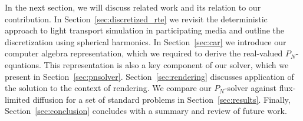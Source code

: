 In the next section, we will discuss related work and its relation to our contribution. In Section~\ref{sec:discretized_rte} we revisit the deterministic approach to light transport simulation in participating media and outline the discretization using spherical harmonics. In Section~\ref{sec:car} we introduce our computer algebra representation, which we required to derive the real-valued $P_N$-equations. This representation is also a key component of our solver, which we present in Section~\ref{sec:pnsolver}. Section~\ref{sec:rendering} discusses application of the solution to the context of rendering. We compare our $P_N$-solver against flux-limited diffusion for a set of standard problems in Section~\ref{sec:results}. Finally, Section~\ref{sec:conclusion} concludes with a summary and review of future work.